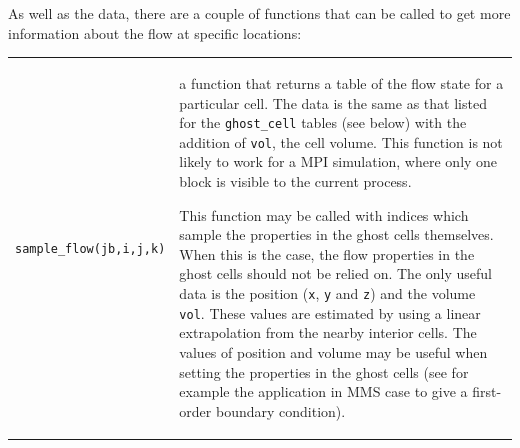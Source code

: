 \noindent
As well as the data, there are a couple of functions that can be called to get more information about
the flow at specific locations:\\
\begin{tabular}{ll} 
 \noalign{\smallskip} \hline \noalign{\smallskip}
 \texttt{sample\_flow(jb,i,j,k)} & \parbox{10cm}{a function that returns a table of 
                                      the flow state for a particular cell.  The data is the same as that
                                      listed for the \texttt{ghost\_cell} tables (see below) with the addition of \texttt{vol},
                                      the cell volume.  This function is not likely to work for a MPI simulation,
                                      where only one block is visible to the current process.

                                      This function may be called with indices which sample the properties
                                      in the ghost cells themselves. When this is the case, the flow properties
                                      in the ghost cells should not be relied on. The only useful data is
                                      the position (\texttt{x}, \texttt{y} and \texttt{z}) and the volume
                                      \texttt{vol}. These values are estimated by using a linear extrapolation
                                      from the nearby interior cells. The values of position and volume may
                                      be useful when setting the properties in the ghost cells (see for
                                      example the application in MMS case to give a first-order boundary
                                      condition).
                                                                             

}
\end{tabular}
